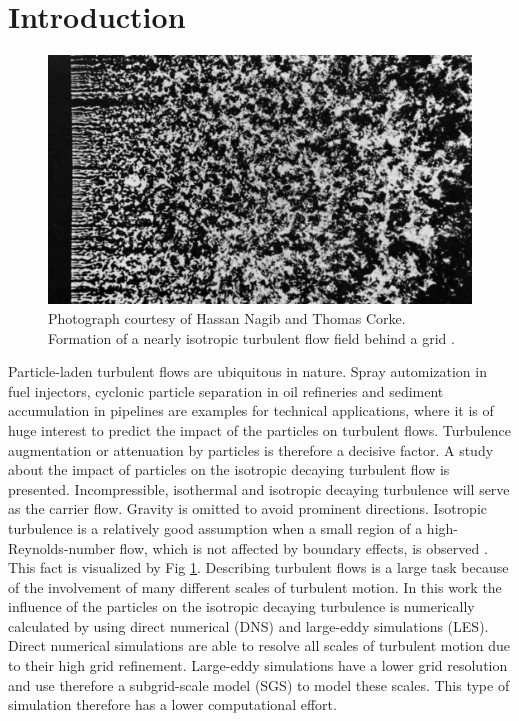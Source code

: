 \documentclass[11pt,a4paper,openany,oneside,parskip=half*]{article}
\begin{document}
\section{Introduction}
\setcounter{page}{1}
\begin{figure}[h]
	\centering
  \includegraphics[width=\textwidth]{./Abbildungen/TurbulentMotion_Introduction.png}
  \captionsetup{width=0.97\linewidth}
	\caption{Photograph courtesy of Hassan Nagib and Thomas Corke. Formation of a nearly isotropic turbulent flow field behind a grid \cite{albumOfFluidMotion}.}
	\label{introduction_picture}
\end{figure}
Particle-laden turbulent flows are ubiquitous in nature.
Spray automization in fuel injectors, cyclonic particle separation in oil refineries and sediment accumulation in pipelines are examples for technical applications, where it is of huge interest to predict the impact of the particles on turbulent flows.
Turbulence augmentation or attenuation by particles is therefore a decisive factor.
\newline
A study about the impact of particles on the isotropic decaying turbulent flow is presented.
Incompressible, isothermal and isotropic decaying turbulence will serve as the carrier flow. Gravity is omitted to avoid prominent directions. Isotropic turbulence is a relatively good assumption when a small region of a high-Reynolds-number flow, which is not affected by boundary effects, is observed \cite{Kolmogorov1941}. This fact is visualized by Fig \ref{introduction_picture}. Describing turbulent flows is a large task because of the involvement of many different scales of turbulent motion.
\newline
In this work the influence of the particles on the isotropic decaying turbulence is numerically calculated by using direct numerical (DNS) and large-eddy simulations (LES). Direct numerical simulations are able to resolve all scales of turbulent motion due to their high grid refinement. Large-eddy simulations have a lower grid resolution and use therefore a subgrid-scale model (SGS) to model these scales. This type of simulation therefore has a lower computational effort.
\end{document}

